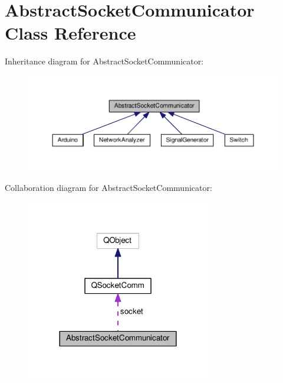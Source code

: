 \hypertarget{class_abstract_socket_communicator}{\section{Abstract\+Socket\+Communicator Class Reference}
\label{class_abstract_socket_communicator}
}


Inheritance diagram for Abstract\+Socket\+Communicator\+:
\nopagebreak
\begin{figure}[H]
\begin{center}
\leavevmode
\includegraphics[width=350pt]{class_abstract_socket_communicator__inherit__graph}
\end{center}
\end{figure}


Collaboration diagram for Abstract\+Socket\+Communicator\+:\nopagebreak
\begin{figure}[H]
\begin{center}
\leavevmode
\includegraphics[width=228pt]{class_abstract_socket_communicator__coll__graph}
\end{center}
\end{figure}

